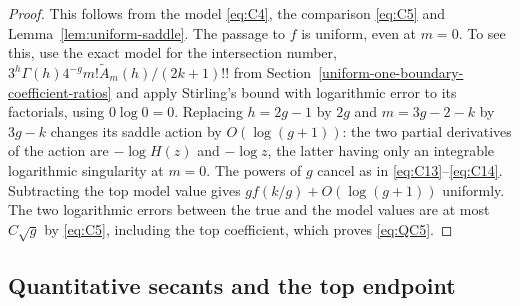 \begin{proof}
This follows from the model \eqref{eq:C4}, the comparison \eqref{eq:C5} and
Lemma~\ref{lem:uniform-saddle}. The passage to $f$ is uniform, even at
$m=0$. To see this, use the
exact model for the intersection number,
$3^h\Gamma(h)4^{-g}m!\widetilde A_m(h)/(2k+1)!!$ from Section~\ref{uniform-one-boundary-coefficient-ratios}
and apply Stirling's bound with logarithmic error to its factorials,
using $0\log0=0$. Replacing $h=2g-1$ by $2g$ and
$m=3g-2-k$ by $3g-k$ changes its saddle action by $O(\log(g+1))$:
the two partial derivatives of the action are $-\log H(z)$ and
$-\log z$, the latter having only an integrable logarithmic
singularity at $m=0$. The powers of $g$ cancel as in
\eqref{eq:C13}--\eqref{eq:C14}. Subtracting the top model value gives
$g f(k/g)+O(\log(g+1))$ uniformly. The two logarithmic errors between
the true and the model values are at most $C\sqrt g$ by \eqref{eq:C5}, including the top
coefficient, which proves \eqref{eq:QC5}.
\end{proof}

\subsection{Quantitative secants and the top endpoint}

